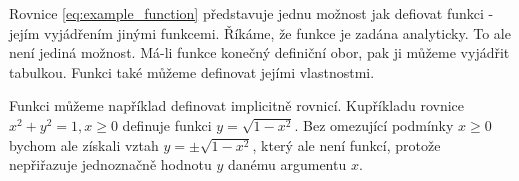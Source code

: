 Rovnice \eqref{eq:example_function} představuje jednu možnost jak defiovat funkci - jejím vyjádřením jinými funkcemi. Říkáme, že funkce je zadána analyticky. To ale není jediná možnost. Má-li funkce konečný definiční obor, pak ji můžeme vyjádřit tabulkou. Funkci také můžeme definovat jejími vlastnostmi.

Funkci můžeme například definovat implicitně rovnicí. Kupříkladu rovnice \(x^2 + y^2 = 1, x \geq 0\) definuje funkci \(y = \sqrt{1 - x^2}\). Bez omezující podmínky \(x \geq 0\) bychom ale získali vztah \(y = \pm \sqrt{1 - x^2}\), který ale není funkcí, protože nepřiřazuje jednoznačně hodnotu \(y\) danému argumentu \(x\).

